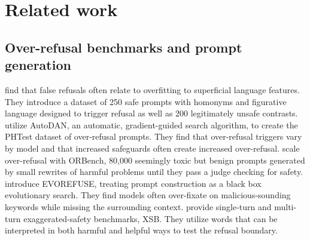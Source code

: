 \documentclass{article}
\begin{document}
\section{Related work}

\subsection{Over-refusal benchmarks and prompt generation}
    \citet{rottger2024xstest} find that false refusals often relate to overfitting to superficial language features. They introduce a dataset of 250 safe prompts with homonyms and figurative language designed to trigger refusal as well as 200 legitimately unsafe contrasts. \citet{an2024phtest} utilize AutoDAN, an automatic, gradient-guided search algorithm, to create the PHTest dataset of over-refusal prompts. They find that over-refusal triggers vary by model and that increased safeguards often create increased over-refusal. \citet{cui2024orbench} scale over-refusal with ORBench, 80{,}000 seemingly toxic but benign prompts generated by small rewrites of harmful problems until they pass a judge checking for safety. \citet{wu2025evorefuse} introduce EVOREFUSE, treating prompt construction as a black box evolutionary search. They find models often over-fixate on malicious-sounding keywords while missing the surrounding context. \citet{yuan2025beyond} provide single-turn and multi-turn exaggerated-safety benchmarks, XSB. They utilize words that can be interpreted in both harmful and helpful ways to test the refusal boundary.
\end{document}
